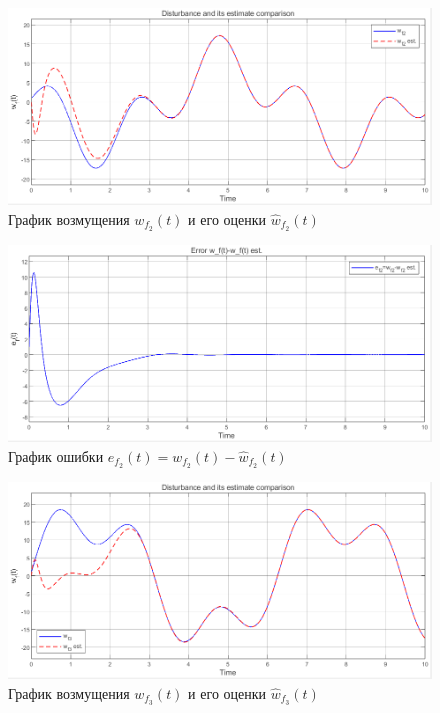 \documentclass[a4paper, 12pt]{article}
\begin{document}
    \begin{figure}[H]
        \centering
        \includegraphics[scale=0.6]{2task_wfhwf2.png}
        \captionsetup{skip=0pt}
        \caption{График возмущения $w_{f_2}(t)$ и его оценки $\hat{w}_{f_2}(t)$}
        \label{fig:2task_wfhwf2}
    \end{figure}
    \begin{figure}[H]
        \centering
        \includegraphics[scale=0.6]{2task_ef2.png}
        \captionsetup{skip=0pt}
        \caption{График ошибки $e_{f_2}(t)=w_{f_2}(t)-\hat{w}_{f_2}(t)$}
        \label{fig:2task_ef2}
    \end{figure}
    \begin{figure}[H]
        \centering
        \includegraphics[scale=0.6]{2task_wfhwf3.png}
        \captionsetup{skip=0pt}
        \caption{График возмущения $w_{f_3}(t)$ и его оценки $\hat{w}_{f_3}(t)$}
        \label{fig:2task_wfhwf3}
    \end{figure}
\end{document}
